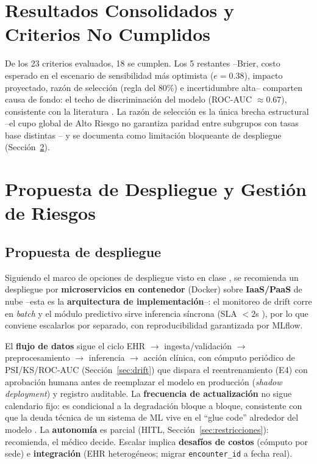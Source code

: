\documentclass[11pt,a4paper]{article}
\begin{document}
\section{Resultados Consolidados y Criterios No Cumplidos}
\label{sec:resumen-criterios}



De los 23 criterios evaluados, 18 se cumplen. Los 5 restantes --Brier, costo esperado en el escenario de sensibilidad más optimista ($e=0.38$), impacto proyectado, razón de selección (regla del 80\%) e incertidumbre alta-- comparten causa de fondo: el techo de discriminación del modelo (ROC-AUC $\approx0.67$), consistente con la literatura \cite{kansagara2011,emijohnson2025}. La razón de selección es la única brecha estructural --el cupo global de Alto Riesgo no garantiza paridad entre subgrupos con tasas base distintas \cite{chouldechova2017}-- y se documenta como limitación bloqueante de despliegue (Sección~\ref{sec:despliegue}).

\section{Propuesta de Despliegue y Gestión de Riesgos}
\label{sec:despliegue}

\subsection{Propuesta de despliegue}

Siguiendo el marco de opciones de despliegue visto en clase \cite{soriano2026}, se recomienda un despliegue por \textbf{microservicios en contenedor} (Docker) sobre \textbf{IaaS/PaaS} de nube --esta es la \textbf{arquitectura de implementación}--: el monitoreo de drift corre en \emph{batch} y el módulo predictivo sirve inferencia síncrona (SLA $<2$s \cite{nawaz2026}), por lo que conviene escalarlos por separado, con reproducibilidad garantizada por MLflow.

El \textbf{flujo de datos} sigue el ciclo EHR $\to$ ingesta/validación $\to$ preprocesamiento $\to$ inferencia $\to$ acción clínica, con cómputo periódico de PSI/KS/ROC-AUC (Sección~\ref{sec:drift}) que dispara el reentrenamiento (E4) con aprobación humana antes de reemplazar el modelo en producción (\emph{shadow deployment}) y registro auditable. La \textbf{frecuencia de actualización} no sigue calendario fijo: es condicional a la degradación bloque a bloque, consistente con que la deuda técnica de un sistema de ML vive en el ``glue code'' alrededor del modelo \cite{sculley2015}. La \textbf{autonomía} es parcial (HITL, Sección~\ref{sec:restricciones}): recomienda, el médico decide. Escalar implica \textbf{desafíos de costos} (cómputo por sede) e \textbf{integración} (EHR heterogéneos; migrar \texttt{encounter\_id} a fecha real).
\end{document}

